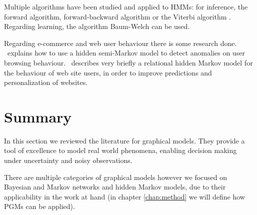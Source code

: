 Multiple algorithms have been studied and applied to HMMs: for inference, the 
forward algorithm, forward-backward algorithm \cite{baum1967inequality} or the 
Viterbi algorithm \cite{forney2005viterbi, martin2000speech}. Regarding 
learning, the algorithm Baum-Welch \cite{Baum1966, baum1967inequality} can be 
used.

Regarding e-commerce and web user behaviour there is some research done. 
\cite{Xie2009}~explains how to use a hidden semi-Markov model to detect 
anomalies on user browsing behaviour. \cite{Anderson2002}~describes very 
briefly a relational hidden Markov model for the behaviour of web site users, 
in order to improve predictions and personalization of websites.

\section{Summary}

In this section we reviewed the literature for graphical models. They provide a 
tool of excellence to model real world phenomena, enabling decision making 
under uncertainty and noisy observations.

There are multiple categories of graphical models however we focused on 
Bayesian and Markov networks and hidden Markov models, due to their 
applicability in the work at hand (in chapter \ref{chap:method} we will define 
how PGMs can be applied).
